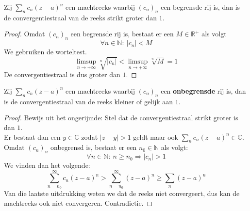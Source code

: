 \documentclass[main.tex]{subfiles}
\begin{document}

\begin{st}
  Zij $\sum_{n}c_{n}(z-a)^{n}$ een machtreeks waarbij $(c_{n})_{n}$ een begrensde rij is, dan is de convergentiestraal van de reeks strikt groter dan $1$.

  \begin{proof}
    Omdat $(c_{n})_{n}$ een begrensde rij is, bestaat er een $M\in\mathbb{R}^{+}$ als volgt
    \[ \forall n\in\mathbb{N}:\ |c_{n}| < M \]
    We gebruiken de worteltest.
    \[ \limsup_{n\rightarrow +\infty}\sqrt[n]{|c_{n}|} < \limsup_{n\rightarrow +\infty}\sqrt[n]{M} = 1 \]
    De convergentiestraal is dus groter dan $1$.
  \end{proof}
\end{st}

\begin{st}
  Zij $\sum_{n}c_{n}(z-a)^{n}$ een machtreeks waarbij $(c_{n})_{n}$ een \textbf{onbegrensde} rij is, dan is de convergentiestraal van de reeks kleiner of gelijk aan $1$.

  \begin{proof}
    Bewijs uit het ongerijmde: Stel dat de convergentiestraal strikt groter is dan $1$.\\
    Er bestaat dan een $y\in \mathbb{C}$ zodat $|z-y| > 1$ geldt maar ook $\sum_{n}c_{n}(z-a)^{n} \in\mathbb{C}$.
    Omdat $(c_{n})_{n}$ onbegrensd is, bestaat er een $n_{0}\in\mathbb{N}$ als volgt:
    \[ \forall n\in\mathbb{N}:\ n\ge n_{0} \Rightarrow |c_{n}| > 1 \]
    We vinden dan het volgende:
    \[ \sum_{n=n_{0}}^{\infty}c_{n}(z-a)^{n} > \sum_{n=n_{0}}^{\infty} (z-a)^{n} \ge \sum_{n}(z-a)^{n} \]
    Van die laatste uitdrukking weten we dat de reeks niet convergeert, dus kan de machtreeks ook niet convergeren.
    Contradictie.
  \end{proof}
\end{st}
\end{document}
